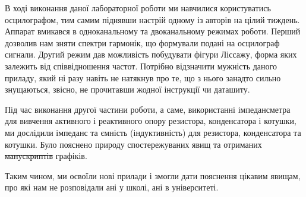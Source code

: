 В ході виконання даної лабораторної роботи ми навчилися користуватись осцилографом, тим самим піднявши настрій одному із авторів на цілий тиждень. Аппарат вмикався в одноканальному та двоканальному режимах роботи. Перший дозволив нам зняти спектри гармонік, що формували подані на осцилограф сигнали. Другий режим дав можливість побудувати фігури Ліссажу, форма яких залежить від співвідношення частот. Потрібно відзначити мужність даного приладу, який ні разу навіть не натякнув про те, що з нього занадто сильно знущаються, звісно, не прочитавши жодної інструкції чи даташиту.

Під час виконання другої частини роботи, а саме, використанні імпедансметра для вивчення активного і реактивного опору резистора, конденсатора і котушки, ми дослідили імпеданс та ємність (індуктивність) для резистора, конденсатора та котушки. Було пояснено природу спостережуваних явищ та отриманих \sout{манускриптів} графіків.

Таким чином, ми освоїли нові прилади і змогли дати пояснення цікавим явищам, про які нам не розповідали ані у школі, ані в університеті.

